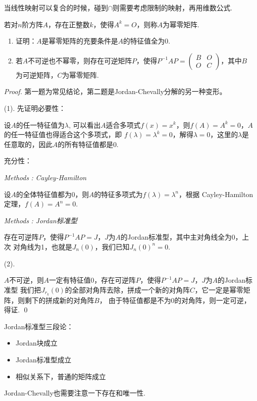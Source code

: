 \begin{remark}
	当线性映射可以复合的时候，碰到$\cap $则需要考虑限制的映射，再用维数公式.
\end{remark}

\begin{ex}[苏大2022]
	若对$n$阶方阵$A$，存在正整数$k$，使得$A^k=O$，则称$A$为幂零矩阵.
	\begin{enumerate}
		\item 证明：$A$是幂零矩阵的充要条件是$A$的特征值全为0.
		\item 若$A$不可逆也不幂零，则存在可逆矩阵$P$，使得$P^{-1} A P = \begin{pmatrix}
			B & O \\
			O & C
		\end{pmatrix}$，其中$B$为可逆矩阵，$C$为幂零矩阵.
	\end{enumerate}
\end{ex}

\begin{proof}
	第一题为常见结论，第二题是Jordan-Chevally分解的另一种变形。

	(1). 先证明必要性：

	设$A$的任一特征值为$\lambda$,
	可以看出$A$适合多项式$f(x) = x^k$，则$f(A)=A^k=0$，$A$的任一特征值也得适合这个多项式，即
	$f(\lambda)=\lambda^k=0$，解得$\lambda=0$，这里的$\lambda$是任意取的，因此$A$的所有特征值都是0.

	充分性：

	\emph{Methods\,\,\uppercase\expandafter{}: Cayley-Hamilton}

	设$A$的全体特征值都为0，则$A$的特征多项式为$f(\lambda)=\lambda^n$，根据
	Cayley-Hamilton定理，$f(A)=A^n=0$.

	\emph{Methods\,\,\uppercase\expandafter{}: Jordan标准型}

	存在可逆阵$P$，使得$P^{-1}AP=J$，$J$为$A$的Jordan标准型，其中主对角线全为0，上次
	对角线为1，也就是$J_n(0)$，我们已知$J_n(0)^{n}=0$.

	(2). 

	$A$不可逆，则$A$一定有特征值$0$，存在可逆阵$P$，使得$P^{-1}AP=J$，$J$为$A$的Jordan标准型
	我们把$J_{r_k}(0)$的全部对角阵去除，拼成一个新的对角阵$C$，它一定是幂零矩阵，则剩下的拼成新的对角阵$B$，
	由于特征值都是不为0的对角阵，则一定可逆，得证.
	\qed{}
\end{proof}

\begin{remark}
	Jordan标准型三段论：
	\begin{itemize}
		\item Jordan块成立
		\item Jordan标准型成立
		\item 相似关系下，普通的矩阵成立
	\end{itemize}
	Jordan-Chevally也需要注意一下存在和唯一性.
\end{remark}

